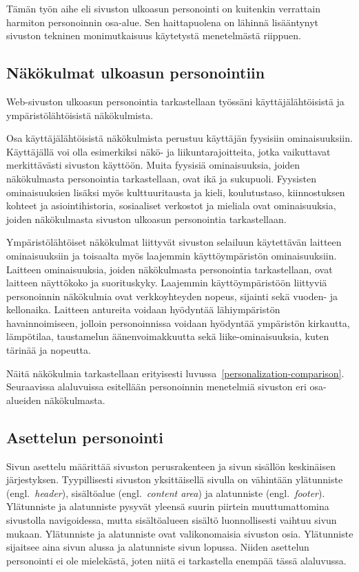 \documentclass[finnish, 12pt, a4paper, elec, utf8, a-1b, online]{aaltothesis}
\begin{document}
Tämän työn aihe eli sivuston ulkoasun personointi on kuitenkin verrattain
harmiton personoinnin osa-alue. Sen haittapuolena on lähinnä lisääntynyt
sivuston tekninen monimutkaisuus käytetystä menetelmästä riippuen.

\subsection{Näkökulmat ulkoasun personointiin}\label{personalization-aspects}

Web-sivuston ulkoasun personointia tarkastellaan työssäni käyttäjälähtöisistä ja
ympäristölähtöisistä näkökulmista.

Osa käyttäjälähtöisistä näkökulmista perustuu käyttäjän fyysisiin
ominaisuuksiin. Käyttäjällä voi olla esimerkiksi näkö- ja liikuntarajoitteita,
jotka vaikuttavat merkittävästi sivuston käyttöön. Muita fyysisiä ominaisuuksia,
joiden näkökulmasta personointia tarkastellaan, ovat ikä ja sukupuoli. Fyysisten
ominaisuuksien lisäksi myös kulttuuritausta ja kieli, koulutustaso,
kiinnostuksen kohteet ja asiointihistoria, sosiaaliset verkostot ja mieliala
ovat ominaisuuksia, joiden näkökulmasta sivuston ulkoasun personointia
tarkastellaan.

Ympäristölähtöiset näkökulmat liittyvät sivuston selailuun käytettävän laitteen
ominaisuuksiin ja toisaalta myös laajemmin käyttöympäristön ominaisuuksiin.
Laitteen ominaisuuksia, joiden näkökulmasta personointia tarkastellaan, ovat
laitteen näyttökoko ja suorituskyky. Laajemmin käyttöympäristöön liittyviä
personoinnin näkökulmia ovat verkkoyhteyden nopeus, sijainti sekä vuoden- ja
kellonaika. Laitteen antureita voidaan hyödyntää lähiympäristön havainnoimiseen,
jolloin personoinnissa voidaan hyödyntää ympäristön kirkautta, lämpötilaa,
taustamelun äänenvoimakkuutta sekä liike-ominaisuuksia, kuten tärinää ja
nopeutta.

Näitä näkökulmia tarkastellaan erityisesti
luvussa~\ref{personalization-comparison}. Seuraavissa alaluvuissa esitellään
personoinnin menetelmiä sivuston eri osa-alueiden näkökulmasta.

\subsection{Asettelun personointi}\label{layout-personalization}

Sivun asettelu määrittää sivuston perusrakenteen ja sivun sisällön keskinäisen
järjestyksen. Tyypillisesti sivuston yksittäisellä sivulla on vähintään
ylätunniste (engl.~\textit{header}), sisältöalue (engl.~\textit{content area})
ja alatunniste (engl.~\textit{footer}). Ylätunniste ja alatunniste pysyvät
yleensä suurin piirtein muuttumattomina sivustolla navigoidessa, mutta
sisältöalueen sisältö luonnollisesti vaihtuu sivun mukaan. Ylätunniste ja
alatunniste ovat valikonomaisia sivuston osia. Ylätunniste sijaitsee aina sivun
alussa ja alatunniste sivun lopussa. Niiden asettelun personointi ei ole
mielekästä, joten niitä ei tarkastella enempää tässä alaluvussa.
\end{document}
